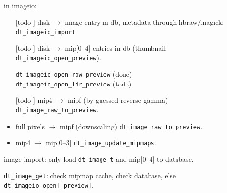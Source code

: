 \documentclass[a4paper,twoside]{scrartcl}
\newcommand{\code}[1]{\texttt{\color{codecol}#1}}
\begin{document}
in imageio:
\begin{itemize}
  \item[[todo]] disk $\rightarrow$ image entry in db, metadata through libraw/magick: \code{dt\_imageio\_import}
  \item[[todo]] disk $\rightarrow$ mip[0--4] entries in db (thumbnail \code{dt\_imageio\_open\_preview}).

             \code{dt\_imageio\_open\_raw\_preview} (done)\\
             \code{dt\_imageio\_open\_ldr\_preview} (todo)
  \item[[todo]] mip4 $\rightarrow$ mipf (by guessed reverse gamma) \code{dt\_image\_raw\_to\_preview}.
  \item full pixels $\rightarrow$ mipf (downscaling) \code{dt\_image\_raw\_to\_preview}.
  \item mip4 $\rightarrow$ mip[0--3] \code{dt\_image\_update\_mipmaps}.
\end{itemize}

image import: only load \code{dt\_image\_t} and mip[0--4] to database.

\code{dt\_image\_get}: check mipmap cache, check database, else \code{dt\_imageio\_open[\_preview]}.
\end{document}
